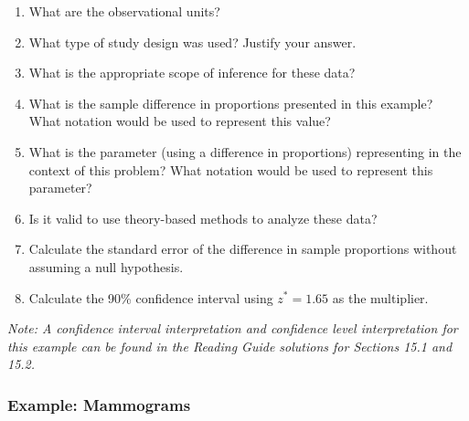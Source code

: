 \documentclass[
]{report}
\newcommand{\rgs}{\vspace{12pt}} %
\begin{document}
\begin{enumerate}
\def\labelenumi{\arabic{enumi}.}
\item
  What are the observational units?
  \rgs
\item
  What type of study design was used? Justify your answer.
  \rgs
\item
  What is the appropriate scope of inference for these data?
  \rgs
\item
  What is the sample difference in proportions presented in this example? What notation would be used to represent this value?
  \rgs
\item
  What is the parameter (using a difference in proportions) representing in the context of this problem? What notation would be used to represent this parameter?
  \rgs
\item
  Is it valid to use theory-based methods to analyze these data?
  \rgs
  \rgs
\item
  Calculate the standard error of the difference in sample proportions without assuming a null hypothesis.
  \rgs
  \rgs
\item
  Calculate the 90\% confidence interval using \(z^*=1.65\) as the multiplier.
  \rgs
  \rgs
\end{enumerate}

\emph{Note: A confidence interval interpretation and confidence level interpretation for this example can be found in the Reading Guide solutions for Sections 15.1 and 15.2.}

\hypertarget{example-mammograms}{%
\subsubsection*{Example: Mammograms}\label{example-mammograms}}
\end{document}

